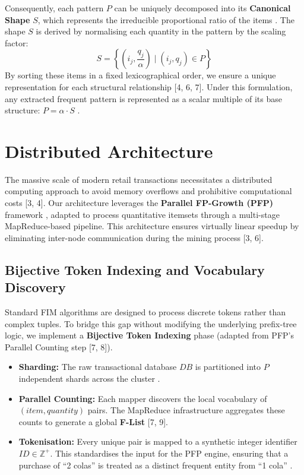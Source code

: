 \documentclass[10pt, twocolumn]{article}
\begin{document}
Consequently, each pattern $P$ can be uniquely decomposed into its
\textbf{Canonical Shape} $S$, which represents the irreducible proportional
ratio of the items . The shape $S$ is derived by normalising each quantity
in the pattern by the scaling factor:
\begin{equation}
    S = \left\{ \left(i_j, \frac{q_j}{\alpha}\right) \mid (i_j, q_j) \in P
    \right\}
\end{equation}
By sorting these items in a fixed lexicographical order, we ensure a unique
representation for each structural relationship [4, 6, 7]. Under this
formulation, any extracted frequent pattern is represented as a scalar multiple
of its base structure: $P = \alpha \cdot S$ .

\section{Distributed Architecture}

The massive scale of modern retail transactions necessitates a distributed
computing approach to avoid memory overflows and prohibitive computational
costs [3, 4]. Our architecture leverages the \textbf{Parallel FP-Growth (PFP)}
framework , adapted to process quantitative itemsets through a multi-stage
MapReduce-based pipeline. This architecture ensures virtually linear speedup by
eliminating inter-node communication during the mining process [3, 6].

\subsection{Bijective Token Indexing and Vocabulary Discovery}

Standard FIM algorithms are designed to process discrete tokens rather than
complex tuples. To bridge this gap without modifying the underlying
prefix-tree logic, we implement a \textbf{Bijective Token Indexing} phase
(adapted from PFP's Parallel Counting step [7, 8]).
\begin{itemize}
    \item \textbf{Sharding:} The raw transactional database $DB$ is
          partitioned into $P$ independent shards across the cluster .
    \item \textbf{Parallel Counting:} Each mapper discovers the local
          vocabulary of $(item, quantity)$ pairs. The MapReduce infrastructure
          aggregates these counts to generate a global \textbf{F-List} [7, 9].
    \item \textbf{Tokenisation:} Every unique pair is mapped to a synthetic
          integer identifier $ID \in \mathbb{Z}^+$. This standardises the input
          for the PFP engine, ensuring that a purchase of ``2 colas'' is treated
          as a distinct frequent entity from ``1 cola'' .
\end{itemize}
\end{document}
